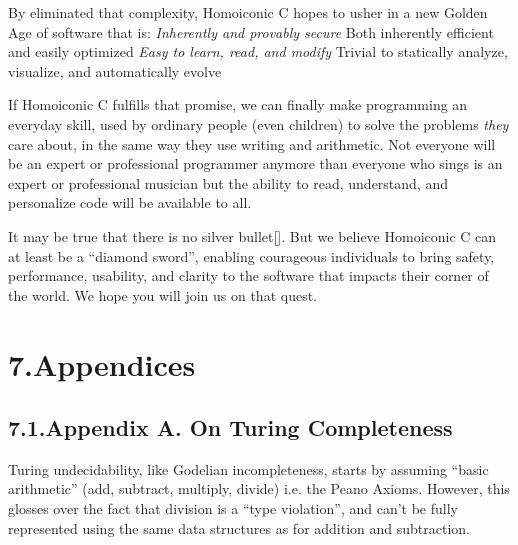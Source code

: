 \documentclass[preprint]{{acmart}}
\begin{document}
By eliminated that complexity, Homoiconic C hopes to usher in a new
Golden Age of software that is:
\emph{ Inherently and provably secure 
} Both inherently efficient and easily optimized
\emph{ Easy to learn, read, and modify
} Trivial to statically analyze, visualize, and automatically evolve%

If Homoiconic C fulfills that promise, we can finally make programming an
everyday skill, used by ordinary people (even children) to solve the
problems \emph{they} care about, in the same way they use writing and
arithmetic. Not everyone will be an expert or professional programmer \textendash{}
anymore than everyone who sings is an expert or professional musician \textendash{}
but the ability to read, understand, and personalize code will be
available to all.%

It may be true that there is no silver bullet[].   But we believe
Homoiconic C can at least be a \textquotedblleft{}diamond sword\textquotedblright{}, enabling courageous individuals
to bring safety, performance, usability, and clarity to the software that
impacts their corner of the world.  We hope you will join us on that quest.%

\section{7.\hspace*{0.5em}Appendices}\label{sec-appendices}%

\subsection{7.1.\hspace*{0.5em}Appendix A. On Turing Completeness}\label{sec-appendix-a-on-turing-completeness}%

\noindent{}Turing undecidability, like Godelian incompleteness, starts by assuming
\textquotedblleft{}basic arithmetic\textquotedblright{} (add, subtract, multiply, divide) \textendash{} i.e. the Peano
Axioms. However, this glosses over the fact that division is a \textquotedblleft{}type
violation\textquotedblright{}, and can't be fully represented using the same data structures
as for addition and subtraction.%
\end{document}
